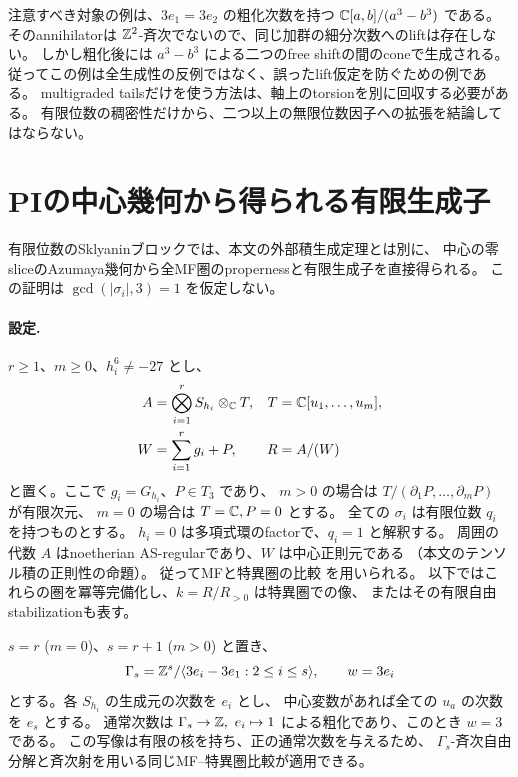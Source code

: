 注意すべき対象の例は、\(3e_1=3e_2\) の粗化次数を持つ
\(\mathbb C[a,b]/(a^3-b^3)\) である。
そのannihilatorは \(\mathbb Z^2\)-斉次でないので、同じ加群の細分次数へのliftは存在しない。
しかし粗化後には \(a^3-b^3\) による二つのfree shiftの間のconeで生成される。
従ってこの例は全生成性の反例ではなく、誤ったlift仮定を防ぐための例である。
multigraded tailsだけを使う方法は、軸上のtorsionを別に回収する必要がある。
有限位数の稠密性だけから、二つ以上の無限位数因子への拡張を結論してはならない。

\section{PIの中心幾何から得られる有限生成子}
\label{sec:notes-pi-residue-generator}

有限位数のSklyaninブロックでは、本文の外部積生成定理とは別に、
中心の零sliceのAzumaya幾何から全MF圏のpropernessと有限生成子を直接得られる。
この証明は \(\gcd(|\sigma_i|,3)=1\) を仮定しない。

\paragraph{設定.}
\(r\ge1\)、\(m\ge0\)、\(h_i^6\ne-27\) とし、
\[
 \begin{aligned}
 A&=\bigotimes_{i=1}^rS_{h_i}\otimes_\mathbb C T,
 &T&=\mathbb C[u_1,\ldots,u_m],\\
 W&=\sum_{i=1}^r g_i+P,
 &R&=A/(W)
 \end{aligned}
\]
と置く。ここで \(g_i=G_{h_i}\)、\(P\in T_3\) であり、
\(m>0\) の場合は \(T/(\partial_1P,\ldots,\partial_mP)\) が有限次元、
\(m=0\) の場合は \(T=\mathbb C,P=0\) とする。
全ての \(\sigma_i\) は有限位数 \(q_i\) を持つものとする。
\(h_i=0\) は多項式環のfactorで、\(q_i=1\) と解釈する。
周囲の代数 \(A\) はnoetherian AS-regularであり、\(W\) は中心正則元である
（本文のテンソル積の正則性の命題）。
従ってMFと特異圏の比較 \cite[Theorem 5.8]{CCKM} を用いられる。
以下ではこれらの圏を冪等完備化し、\(k=R/R_{>0}\) は特異圏での像、
またはその有限自由stabilizationも表す。

\(s=r\) (\(m=0\))、\(s=r+1\) (\(m>0\)) と置き、
\[
 \Gamma_s=\mathbb Z^s/\langle3e_i-3e_1:2\le i\le s\rangle,
 \qquad w=3e_i
\]
とする。各 \(S_{h_i}\) の生成元の次数を \(e_i\) とし、
中心変数があれば全ての \(u_a\) の次数を \(e_s\) とする。
通常次数は \(\Gamma_s\to\ZZ,\ e_i\mapsto1\) による粗化であり、このとき \(w=3\) である。
この写像は有限の核を持ち、正の通常次数を与えるため、
\(\Gamma_s\)-斉次自由分解と斉次射を用いる同じMF--特異圏比較が適用できる。

